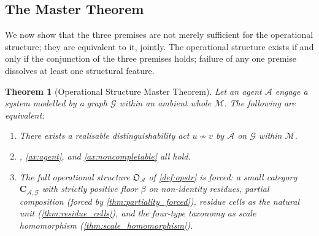 \documentclass[11pt,twocolumn,a4paper]{article}
\theoremstyle{thmstyle}
\newtheorem{theorem}{Theorem}[section]
\theoremstyle{definition}
\theoremstyle{remark}
\newcommand{\Graph}{\mathcal{G}}
\newcommand{\Agent}{\mathcal{A}}
\newcommand{\floor}{\beta}
\newcommand{\OpStr}{\mathfrak{O}}
\begin{document}
\subsection{The Master Theorem}

We now show that the three premises are not merely sufficient for
the operational structure; they are equivalent to it, jointly. The
operational structure exists if and only if the conjunction of the
three premises holds; failure of any one premise dissolves at
least one structural feature.

\begin{theorem}[Operational Structure Master Theorem]
\label{thm:master}
Let an agent $\Agent$ engage a system modelled by a graph $\Graph$
within an ambient whole $\mathcal{M}$. The following are
equivalent:
\begin{enumerate}[label=\textup{(\roman*)},leftmargin=2.2em]
\item There exists a realisable distinguishability act
$u \not\sim v$ by $\Agent$ on $\Graph$ within $\mathcal{M}$.
\item {}, \cref{ax:agent}, and
\cref{ax:noncompletable} all hold.
\item The full operational structure $\OpStr_\Agent$ of
\cref{def:opstr} is forced: a small category
$\mathbf{C}_{\Agent,\Graph}$ with strictly positive floor $\floor$
on non-identity residues, partial composition (forced by
\cref{thm:partiality_forced}), residue cells as the natural unit
(\cref{thm:residue_cells}), and the four-type taxonomy as scale
homomorphism (\cref{thm:scale_homomorphism}).
\end{enumerate}
\end{theorem}
\end{document}
